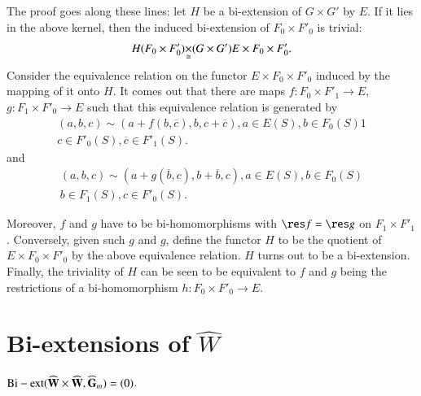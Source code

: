 The proof goes along these lines: let $H$ be a bi-extension of $G\times G'$ by $E$. If it lies in the above kernel, then the induced bi-extension of $F_{0}\times F'_{0}$ is trivial:
$$
H\fprod{(F_{0}\times F'_{0})}{(G\times G')}\cong E\times F_{0}\times F'_{0}.
$$
Consider the equivalence relation on the functor $E\times F_{0}\times F'_{0}$ induced by the mapping of it onto $H$. It comes out that there are maps $f:F_{0}\times F'_{1}\to E$, $g:F_{1}\times F'_{0}\to E$ such that this equivalence relation is generated by
\begin{multline}
(a,b,c)\sim (a+f(b,\overline{c}),b,c+\overline{c}),a\in E(S),b\in F_{0}(S)1\\
c\in F'_{0}(S),\overline{c}\in F'_{1}(S).\label{art15-eq1}
\end{multline}
and
\begin{multline}
(a,b,c)\sim (a+g(\overline{b},c),b+\overline{b},c), a\in E(S), b\in F_{0}(S)\\
b\in F_{1}(S), c\in F'_{0}(S).\label{art15-eq2}
\end{multline}

Moreover, $f$ and $g$ have to be bi-homomorphisms with $\res f=\res g$ on $F_{1}\times F'_{1}$. Conversely, given such $g$ and $g$, define the functor $H$ to be the quotient of $E\times F_{0}\times F'_{0}$ by the above equivalence relation. $H$ turns out to be a bi-extension. Finally, the triviality of $H$ can be seen to be equivalent to $f$ and $g$ being the restrictions of a bi-homomorphism $h:F_{0}\times F'_{0}\to E$.

\section{Bi-extensions of $\widehat{W}$}\label{art15-sec4}

\begin{proposition}\label{art15-prop4}
${\rm Bi-ext } (\widehat{\mathbf{W}}\times \widehat{\mathbf{W}},\widehat{\mathbf{G}}_{m})=(0)$.
\end{proposition}

